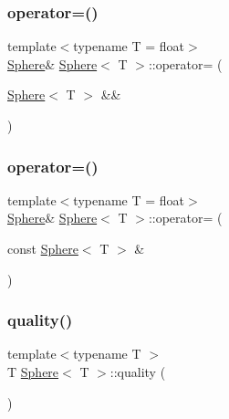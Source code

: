 \mbox{\label{classSphere_aa117f966cea7b16532cbd80c2191a84a}} 
\subsubsection{\texorpdfstring{operator=()}{operator=()}\hspace{0.1cm}{\footnotesize\ttfamily [1/2]}}
{\footnotesize\ttfamily template$<$typename T  = float$>$ \\
\mbox{\hyperlink{classSphere}{Sphere}}\& \mbox{\hyperlink{classSphere}{Sphere}}$<$ T $>$\+::operator= (\begin{DoxyParamCaption}\item[{\mbox{\hyperlink{classSphere}{Sphere}}$<$ T $>$ \&\&}]{ }\end{DoxyParamCaption})\hspace{0.3cm}{\ttfamily [default]}}

\mbox{\label{classSphere_ae989d05c3ea71f5a758e90e2f2e3aecf}} 
\subsubsection{\texorpdfstring{operator=()}{operator=()}\hspace{0.1cm}{\footnotesize\ttfamily [2/2]}}
{\footnotesize\ttfamily template$<$typename T  = float$>$ \\
\mbox{\hyperlink{classSphere}{Sphere}}\& \mbox{\hyperlink{classSphere}{Sphere}}$<$ T $>$\+::operator= (\begin{DoxyParamCaption}\item[{const \mbox{\hyperlink{classSphere}{Sphere}}$<$ T $>$ \&}]{ }\end{DoxyParamCaption})\hspace{0.3cm}{\ttfamily [default]}}

\mbox{\label{classSphere_a9ebc65dabaf8d87fbe599f4b64816f73}} 
\subsubsection{\texorpdfstring{quality()}{quality()}}
{\footnotesize\ttfamily template$<$typename T $>$ \\
T \mbox{\hyperlink{classSphere}{Sphere}}$<$ T $>$\+::quality (\begin{DoxyParamCaption}{ }\end{DoxyParamCaption})}

